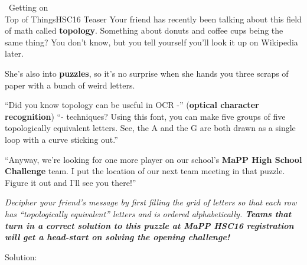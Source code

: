 
\begin{customPuzzle}{~}{Getting on\\Top of Things}{HSC16 Teaser}
  Your friend has recently been talking about this field of math called
  \textbf{topology}. Something about donuts and coffee cups being the same
  thing? You don't know, but you tell yourself you'll look it up on Wikipedia
  later.

  She's also into \textbf{puzzles}, so it's no surprise when she hands you
  three scraps of paper with a bunch of weird letters.

  \vfill


  \vfill

  \newpage

  ``Did you know topology can be useful in OCR -''
  (\textbf{optical character recognition})
  ``- techniques? Using this font, you can make five groups of five
  topologically equivalent letters. See, the A and the G are both
  drawn as a single loop with a curve sticking out.''

  ``Anyway, we're looking for one more player on our school's
  \textbf{MaPP High School Challenge} team.
  I put the location of our next team meeting in that puzzle.
  Figure it out and I'll see you there!''

  \textit{
  Decipher your friend's message by first filling the grid of letters so
  that each row has ``topologically equivalent'' letters and is ordered
  alphabetically. \textbf{Teams that turn in a correct solution to this puzzle
  at MaPP HSC16 registration will get a head-start on solving the opening
  challenge!}
  }

  \begin{center}
    {\large Solution:}
  \end{center}
  \begin{center}
    \hspace{2em}
  \end{center}
  \begin{center}
  \end{center}


\end{customPuzzle}